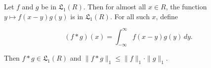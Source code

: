 Let $f$ and $g$ be in $\mathfrak{L}_1(R)$. Then for almost all $x \in R$, the function $y \mapsto f(x - y)g(y)$ is in $\mathfrak{L}_1(R)$. For all such $x$, define

$$(f * g)(x) = \int_{-\infty}^{\infty} f(x - y)g(y) \, dy.$$

Then $f * g \in \mathfrak{L}_1(R)$ and $\|f * g\|_1 \leq \|f\|_1 \cdot \|g\|_1$.
